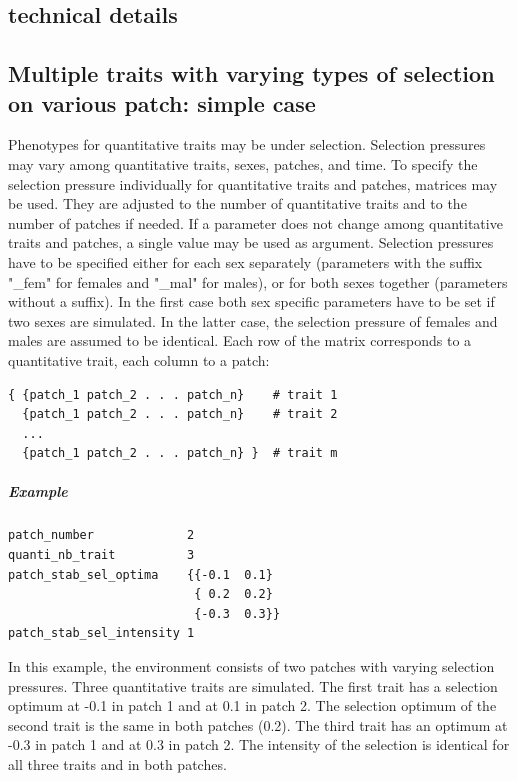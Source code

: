 \documentclass[letterpaper,12pt,oneside]{book}
\begin{document}
\begin{appendices}
\chapter{technical details}\label{chap:TechnicalDetails}
\section{Multiple traits with varying types of selection on various patch: simple case }
Phenotypes for quantitative traits may be under selection. Selection pressures may vary among quantitative traits, sexes, patches, and time. To specify the selection pressure individually for quantitative traits and patches, matrices may be used. They are adjusted to the number of quantitative traits and to the number of patches if needed. If a parameter does not change among quantitative traits and patches, a single value may be used as argument. Selection pressures have to be specified either for each sex separately (parameters with the suffix "\_fem" for females and "\_mal" for males), or for both sexes together (parameters without a suffix). In the first case both sex specific parameters have to be set if two sexes are simulated. In the latter case, the selection pressure of females and males are assumed to be identical. Each row of the matrix corresponds to a quantitative trait, each column to a patch:
\begin{lstlisting}[frame=single]
{ {patch_1 patch_2 . . . patch_n}    # trait 1
  {patch_1 patch_2 . . . patch_n}    # trait 2
  ...
  {patch_1 patch_2 . . . patch_n} }  # trait m
\end{lstlisting}

\paragraph{Example}\hspace*{\fill}
\begin{lstlisting}[frame=single]
patch_number             2
quanti_nb_trait          3
patch_stab_sel_optima    {{-0.1  0.1}                            
                          { 0.2  0.2}
                          {-0.3  0.3}}    
patch_stab_sel_intensity 1                                                    
\end{lstlisting}
In this example, the environment consists of two patches with varying selection pressures. Three quantitative traits are simulated. The first trait has a selection optimum at -0.1 in patch 1 and at 0.1 in patch 2. The selection optimum of the second trait is the same in both patches (0.2). The third trait has an optimum at -0.3 in patch 1 and at 0.3 in patch 2. The intensity of the selection is identical for all three traits and in both patches.    

\end{appendices}
\end{document}
